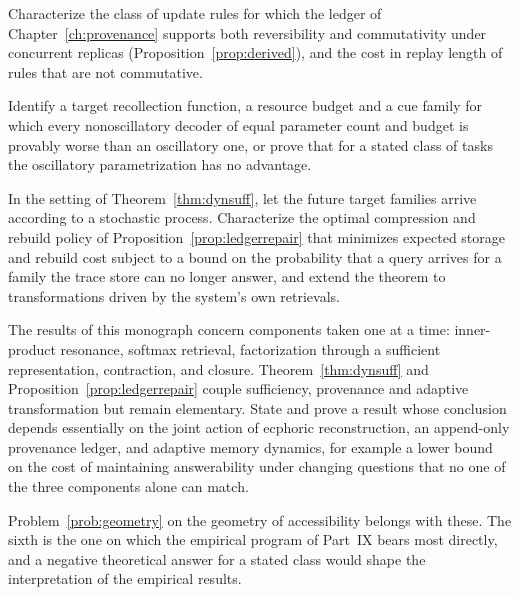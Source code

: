 \begin{problem}\label{prob:prov}
Characterize the class of update rules for which the ledger of Chapter~\ref{ch:provenance} supports both reversibility and commutativity under concurrent replicas (Proposition~\ref{prop:derived}), and the cost in replay length of rules that are not commutative.
\end{problem}

\begin{problem}\label{prob:osc}
Identify a target recollection function, a resource budget and a cue family for which every nonoscillatory decoder of equal parameter count and budget is provably worse than an oscillatory one, or prove that for a stated class of tasks the oscillatory parametrization has no advantage.
\end{problem}

\begin{problem}\label{prob:dynuncertain}
In the setting of Theorem~\ref{thm:dynsuff}, let the future target families arrive according to a stochastic process. Characterize the optimal compression and rebuild policy of Proposition~\ref{prop:ledgerrepair} that minimizes expected storage and rebuild cost subject to a bound on the probability that a query arrives for a family the trace store can no longer answer, and extend the theorem to transformations driven by the system's own retrievals.
\end{problem}

\begin{problem}\label{prob:interaction}
The results of this monograph concern components taken one at a time: inner-product resonance, softmax retrieval, factorization through a sufficient representation, contraction, and closure. Theorem~\ref{thm:dynsuff} and Proposition~\ref{prop:ledgerrepair} couple sufficiency, provenance and adaptive transformation but remain elementary. State and prove a result whose conclusion depends essentially on the joint action of ecphoric reconstruction, an append-only provenance ledger, and adaptive memory dynamics, for example a lower bound on the cost of maintaining answerability under changing questions that no one of the three components alone can match.
\end{problem}

Problem~\ref{prob:geometry} on the geometry of accessibility belongs with these. The sixth is the one on which the empirical program of Part~IX bears most directly, and a negative theoretical answer for a stated class would shape the interpretation of the empirical results.

